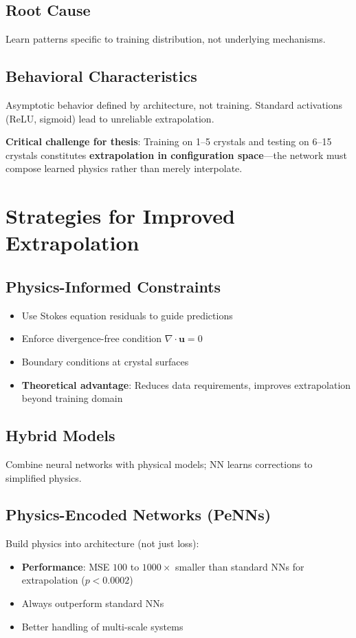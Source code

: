 \subsection{Root Cause}
Learn patterns specific to training distribution, not underlying mechanisms.

\subsection{Behavioral Characteristics}
Asymptotic behavior defined by architecture, not training. Standard activations (ReLU, sigmoid) lead to unreliable extrapolation.

\textbf{Critical challenge for thesis}: Training on 1--5 crystals and testing on 6--15 crystals constitutes \textbf{extrapolation in configuration space}---the network must compose learned physics rather than merely interpolate.

\section{Strategies for Improved Extrapolation}

\subsection{Physics-Informed Constraints}
\begin{itemize}
    \item Use Stokes equation residuals to guide predictions
    \item Enforce divergence-free condition $\nabla \cdot \mathbf{u} = 0$
    \item Boundary conditions at crystal surfaces
    \item \textbf{Theoretical advantage}: Reduces data requirements, improves extrapolation beyond training domain
\end{itemize}

\subsection{Hybrid Models}
Combine neural networks with physical models; NN learns corrections to simplified physics.

\subsection{Physics-Encoded Networks (PeNNs)}
Build physics into architecture (not just loss):
\begin{itemize}
    \item \textbf{Performance}: MSE $100$ to $1000\times$ smaller than standard NNs for extrapolation ($p < 0.0002$)
    \item Always outperform standard NNs
    \item Better handling of multi-scale systems
\end{itemize}

